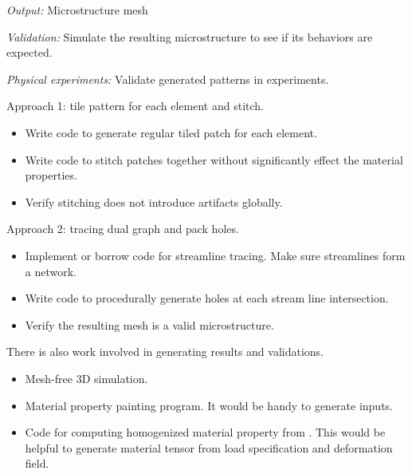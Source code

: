 \begin{description}
{\it Output:} Microstructure mesh

{\it Validation:} Simulate the resulting microstructure to see if its behaviors
are expected.

{\it Physical experiments:} Validate generated patterns in experiments.

Approach 1: tile pattern for each element and stitch.
\begin{itemize}
\item Write code to generate regular tiled patch for each element.
\item Write code to stitch patches together without significantly effect the material
properties.
\item Verify stitching does not introduce artifacts globally.
\end{itemize}

Approach 2: tracing dual graph and pack holes.
\begin{itemize}
\item Implement or borrow code for streamline tracing.  Make sure streamlines
form a network.
\item Write code to procedurally generate holes at each stream line
intersection.
\item Verify the resulting mesh is a valid microstructure.
\end{itemize}
\end{description}



There is also work involved in generating results and validations.
\begin{itemize}
\item Mesh-free 3D simulation.
\item Material property painting program.  It would be handy to generate
inputs.
\item Code for computing homogenized material property from
\cite{Kharevych2009}.  This would be helpful to generate material tensor from
load specification and deformation field.
\end{itemize}



